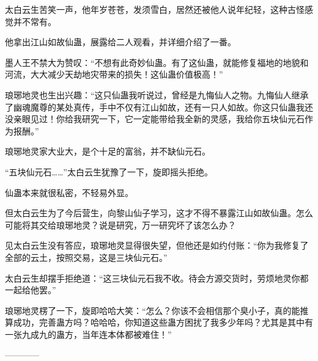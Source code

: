 \begin{this_body}
太白云生苦笑一声，他年岁苍苍，发须雪白，居然还被他人说年纪轻，这种古怪感觉并不常有。

他拿出江山如故仙蛊，展露给二人观看，并详细介绍了一番。

墨人王不禁大为赞叹：“不想有此奇妙仙蛊。有了这仙蛊，就能修复福地的地貌和河流，大大减少天劫地灾带来的损失！这仙蛊价值极高！”

琅琊地灵也生出兴趣：“这只仙蛊我听说过，曾经是九悔仙人之物。九悔仙人继承了幽魂魔尊的某处真传，手中不仅有江山如故，还有一只人如故。你这只仙蛊我还没亲眼见过！你给我研究一下，它一定能带给我全新的灵感，我给你五块仙元石作为报酬。”

琅琊地灵家大业大，是个十足的富翁，并不缺仙元石。

“五块仙元石……”太白云生犹豫了一下，旋即摇头拒绝。

仙蛊本来就很私密，不轻易外显。

但太白云生为了今后营生，向黎山仙子学习，这才不得不暴露江山如故仙蛊。怎么可能将其交给琅琊地灵？说是研究，万一研究坏了该怎么办？

见太白云生没有答应，琅琊地灵显得很失望，但他还是如约付账：“你为我修复了全部的云土，按照交易，这是三块仙元石。”

太白云生却摆手拒绝道：“这三块仙元石我不收。待会方源交货时，劳烦地灵你都一起给他罢。”

琅琊地灵楞了一下，旋即哈哈大笑：“怎么？你该不会相信那个臭小子，真的能推算成功，完善蛊方吗？哈哈哈，你知道这些蛊方困扰了我多少年吗？尤其是其中有一张九成九的蛊方，当年连本体都被难住！”

------------

\end{this_body}

